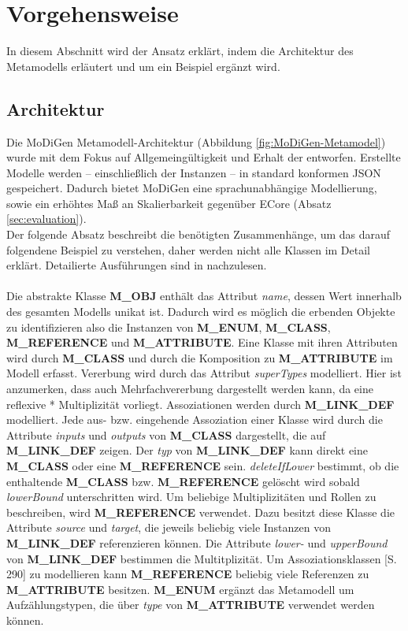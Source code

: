 \section{Vorgehensweise}
In diesem Abschnitt wird der Ansatz erkl\"art, indem die Architektur des Metamodells erl\"autert und um ein Beispiel erg\"anzt wird.

\subsection{Architektur}
Die MoDiGen Metamodell-Architektur (Abbildung \ref{fig:MoDiGen-Metamodel}) wurde mit dem Fokus auf Allgemeingültigkeit und Erhalt der  entworfen. Erstellte Modelle werden -- einschließlich der Instanzen -- in standard konformen JSON gespeichert. Dadurch bietet MoDiGen eine sprachunabhängige Modellierung, sowie ein erhöhtes Maß an Skalierbarkeit gegenüber ECore (Absatz \ref{sec:evaluation}).\\Der folgende Absatz beschreibt die benötigten Zusammenhänge, um das darauf folgendene Beispiel zu verstehen, daher werden nicht alle Klassen im Detail erkl\"art. Detailierte Ausführungen sind in \cite{gerhart2015approach} nachzulesen.\\\\



Die abstrakte Klasse \textbf{M\_OBJ} enth\"alt das Attribut \textit{name}, dessen Wert innerhalb des gesamten Modells unikat ist. Dadurch wird es m\"oglich die erbenden Objekte zu identifizieren also die Instanzen von \textbf{M\_ENUM}, \textbf{M\_CLASS}, \textbf{M\_REFERENCE} und \textbf{M\_ATTRIBUTE}.
Eine Klasse mit ihren Attributen wird durch \textbf{M\_CLASS} und durch die Komposition zu \textbf{M\_ATTRIBUTE} im Modell erfasst. Vererbung wird durch das Attribut \textit{superTypes} modelliert. Hier ist anzumerken, dass auch Mehrfachvererbung dargestellt werden kann, da eine reflexive * Multiplizität vorliegt. 
Assoziationen werden durch \textbf{M\_LINK\_DEF} modelliert. Jede aus- bzw. eingehende Assoziation einer Klasse wird durch die Attribute \textit{inputs} und \textit{outputs} von \textbf{M\_CLASS} dargestellt, die auf \textbf{M\_LINK\_DEF} zeigen. Der \textit{typ} von \textbf{M\_LINK\_DEF} kann direkt eine \textbf{M\_CLASS} oder eine \textbf{M\_REFERENCE} sein. \textit{deleteIfLower} bestimmt, ob die enthaltende \textbf{M\_CLASS} bzw. \textbf{M\_REFERENCE} gel\"oscht wird sobald \textit{lowerBound} unterschritten wird. Um beliebige Multiplizitäten und Rollen zu beschreiben, wird \textbf{M\_REFERENCE} verwendet. Dazu besitzt diese Klasse die Attribute \textit{source} und \textit{target}, die jeweils beliebig viele Instanzen von \textbf{M\_LINK\_DEF} referenzieren können. Die Attribute \textit{lower-} und \textit{upperBound} von \textbf{M\_LINK\_DEF} bestimmen die Multitplizität. Um Assoziationsklassen \cite{larman2005book}[S. 290] zu modellieren kann \textbf{M\_REFERENCE} beliebig viele Referenzen zu \textbf{M\_ATTRIBUTE} besitzen. \textbf{M\_ENUM} erg\"anzt das Metamodell um Aufz\"ahlungstypen, die \"uber \textit{type} von \textbf{M\_ATTRIBUTE} verwendet werden k\"onnen.

